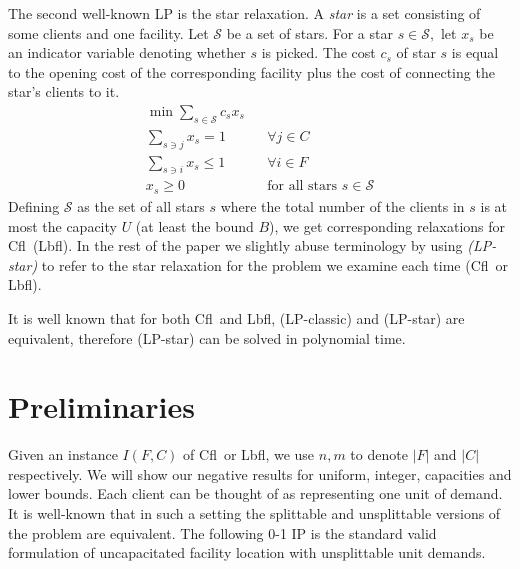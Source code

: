 \documentclass[11pt]{article}\usepackage{amsmath}
\newcommand{\lbfl}{{\sc Lbfl}}
\newcommand{\cfl}{{\sc Cfl}}
\begin{document}
The second well-known LP  is the star relaxation. 
A {\em star} is a set consisting of some  clients and
one facility. Let $\mathcal{S}$ be a set of stars. For a star  $s\in \mathcal{S},$ let  $x_s$ be an indicator variable denoting
whether  $s$ is picked.   The cost  $c_s$ of star $s$   is equal
to the opening cost of the corresponding facility plus the cost of
connecting the star's clients to it. 
\begin{align}
\min \sum_{s \in \mathcal{S}} c_sx_{s}   &&   \tag{LP-star} \\
\sum_{s \ni  j } x_s = 1   && \forall j \in C  \label{star:client} \\
\sum_{s \ni  i } x_s \leq  1   && \forall i \in F \label{star:facility} \\ 
x_s \geq 0       &&  \text{for all stars } s \in \mathcal{S} \label{star:nn} 
\end{align} 
Defining $\mathcal{S}$ as the set of all stars $s$ where  the total number of the clients in $s$ 
is at most the
capacity $U$ (at least the bound $B$),  we get corresponding relaxations for
  \cfl\ (\lbfl).
In the rest of the paper we  slightly abuse terminology by 
using    {\em (LP-star)}  to refer to the
star relaxation for the problem we examine each time (\cfl\  or \lbfl).

It is well known  that for both \cfl\ and \lbfl, (LP-classic) and (LP-star) are
equivalent, therefore (LP-star) can be solved in  polynomial time.





\fi 





\section{Preliminaries}
\label{sec:prel}


Given an instance $I(F,C)$ of \cfl\ or \lbfl, we use $n, m$ to denote $|F|$ and $|C|$
respectively.
We will show our negative results for uniform, integer, capacities and lower
bounds. Each client can be thought of as representing one unit of demand.
 It  is  well-known  that in such a setting  the  splittable  and
unsplittable versions  of the problem are equivalent. 
The following 0-1  IP is the standard  valid formulation of uncapacitated 
facility location with unsplittable unit demands.

\iffalse 
\[ 
\begin{array}{ccc}
 & \min \sum_{i \in F} f_iy_i + \sum_{i \in F}\sum_{j
  \in C} x_{ij}c_{ij}    &    \\   
x_{ij} \leq y_i   \;\;  \forall i \in F, \forall j \in C    & 
\sum_{i \in F} x_{ij} =1   \;\;  \forall j \in C   & 
y_i, x_{ij} \in \{0,1\}   \;\; \forall i \in F, \forall j \in C  
\end{array} \]
\fi
\end{document}
